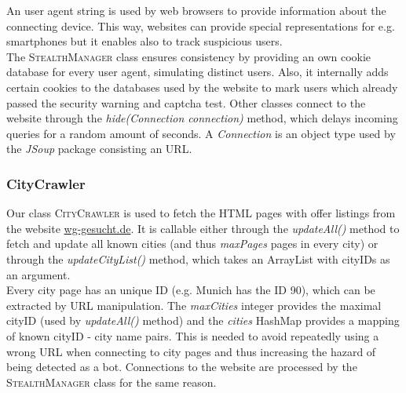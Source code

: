 \documentclass[11pt]{scrartcl}
\begin{document}
An user agent string is used by web browsers to provide information about the connecting device. This way, websites can provide special representations for e.g. smartphones but it enables also to track suspicious users.\\
The \textsc{StealthManager} class ensures consistency by providing an own cookie database for every user agent, simulating distinct users. Also, it internally adds certain cookies to the databases used by the website to mark users which already passed the security warning and captcha test.
Other classes connect to the website through the \textit{hide(Connection connection)} method, which delays incoming queries for a random amount of seconds. A \textit{Connection} is an object type used by the \textit{JSoup} package consisting an URL.


\subsubsection{CityCrawler}


Our class \textsc{CityCrawler} is used to fetch the HTML pages with offer listings from the website \url{wg-gesucht.de}. It is callable either through the \textit{updateAll()} method to fetch and update all known cities (and thus \textit{maxPages} pages in every city) or through the \textit{updateCityList()} method, which takes an ArrayList with cityIDs as an argument.\\
Every city page has an unique ID (e.g. Munich has the ID 90), which can be extracted by URL manipulation. The \textit{maxCities} integer provides the maximal cityID (used by \textit{updateAll()} method) and the \textit{cities} HashMap provides a mapping of known cityID - city name pairs. This is needed to avoid repeatedly using a wrong URL when connecting to city pages and thus increasing the hazard of being detected as a bot. Connections to the website are processed by the \textsc{StealthManager} class for the same reason.
\end{document}
